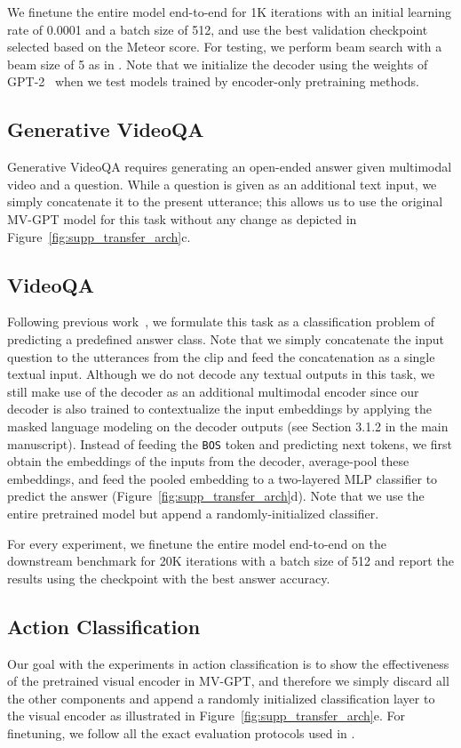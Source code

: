 \documentclass[10pt,twocolumn,letterpaper]{article}
\begin{document}
We finetune the entire model end-to-end for 1K iterations with an initial learning rate of 0.0001 and a batch size of 512, and use the best validation checkpoint selected based on the Meteor score. For testing, we perform beam search with a beam size of 5 as in \cite{luo2020univl}. 
Note that we initialize the decoder using the weights of GPT-2~\cite{radford2019language} when we test models trained by encoder-only pretraining methods. 

\subsection{Generative VideoQA}
Generative VideoQA requires generating an open-ended answer given multimodal video and a question. 
While a question is given as an additional text input, we simply concatenate it to the present utterance; this allows us to use the original MV-GPT model for this task without any change as depicted in Figure~\ref{fig:supp_transfer_arch}c.



\subsection{VideoQA}
Following previous work~\cite{tang2021decembert}, we formulate this task as a classification problem of predicting a predefined answer class.
Note that we simply concatenate the input question to the utterances from the clip and feed the concatenation as a single textual input.
Although we do not decode any textual outputs in this task, we still make use of the decoder as an additional multimodal encoder since our decoder is also trained to contextualize the input embeddings by applying the masked language modeling on the decoder outputs (see Section 3.1.2 in the main manuscript).
Instead of feeding the \texttt{BOS} token and predicting next tokens, we first obtain the embeddings of the inputs from the decoder, average-pool these embeddings, and feed the pooled embedding to a two-layered MLP classifier to predict the answer (Figure~\ref{fig:supp_transfer_arch}d).
Note that we use the entire pretrained model but append a randomly-initialized classifier.

For every experiment, we finetune the entire model end-to-end on the downstream benchmark for 20K iterations with a batch size of 512 and report the results using the checkpoint with the best answer accuracy.

\subsection{Action Classification}
Our goal with the experiments in action classification is to show the effectiveness of the pretrained visual encoder in MV-GPT, and therefore we simply discard all the other components and append a randomly initialized classification layer to the visual encoder as illustrated in Figure~\ref{fig:supp_transfer_arch}e. 
For finetuning, we follow all the exact evaluation protocols used in \cite{arnab2021vivit}.
\end{document}
